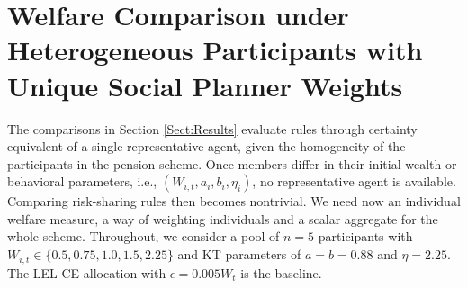\section{Welfare Comparison under Heterogeneous Participants with Unique Social Planner Weights}
\label{Sect:Het_Participants_Unique_Weights}
The comparisons in Section \ref{Sect:Results} evaluate rules through certainty equivalent of a single representative agent, given the homogeneity of the participants in the pension scheme. Once members differ in their initial wealth or behavioral parameters, i.e., $(W_{i,t}, a_i, b_i, \eta_i)$, no representative agent is available. Comparing risk-sharing rules then becomes nontrivial. We need now an individual welfare measure, a way of weighting individuals and a scalar aggregate for the whole scheme. Throughout, we consider a pool of $n=5$ participants with $W_{i,t} \in \{0.5, 0.75, 1.0, 1.5, 2.25\}$ and KT parameters of $a=b=0.88$ and $\eta = 2.25$. The LEL-CE allocation with $\epsilon = 0.005 W_t$ is the baseline. 

